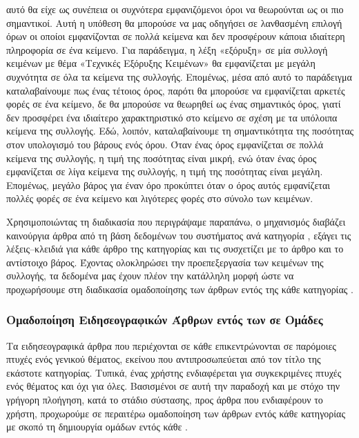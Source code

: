 {{{{{{\begin{itemize}
αυτό θα είχε ως συνέπεια οι συχνότερα εμφανιζόμενοι όροι να θεωρούνται ως οι πιο σημαντικοί. 
Αυτή η υπόθεση θα μπορούσε να μας οδηγήσει σε λανθασμένη επιλογή 
όρων οι οποίοι εμφανίζονται σε πολλά κείμενα και δεν προσφέρουν κάποια ιδιαίτερη πληροφορία σε ένα κείμενο. 
Για παράδειγμα, η λέξη «εξόρυξη» σε μία συλλογή κειμένων με θέμα «Τεχνικές Εξόρυξης Κειμένων» 
θα εμφανίζεται με μεγάλη συχνότητα σε όλα τα κείμενα της συλλογής. 
Επομένως, μέσα από αυτό το παράδειγμα καταλαβαίνουμε πως ένας τέτοιος όρος, παρότι θα μπορούσε 
να εμφανίζεται αρκετές φορές σε ένα κείμενο, δε θα μπορούσε να θεωρηθεί ως ένας σημαντικός όρος,
γιατί δεν προσφέρει ένα ιδιαίτερο χαρακτηριστικό στο  κείμενο σε σχέση με τα υπόλοιπα κείμενα της συλλογής.
Εδώ, λοιπόν, καταλαβαίνουμε τη σημαντικότητα της ποσότητας {} στον υπολογισμό του βάρους ενός όρου. 
Όταν ένας όρος εμφανίζεται σε πολλά κείμενα της συλλογής, η τιμή της ποσότητας {} είναι μικρή, 
ενώ όταν ένας όρος εμφανίζεται σε λίγα κείμενα της συλλογής, η τιμή της ποσότητας {} είναι μεγάλη. \\
Επομένως, μεγάλο βάρος για έναν όρο προκύπτει όταν ο όρος αυτός εμφανίζεται πολλές φορές σε ένα κείμενο 
και λιγότερες φορές στο σύνολο των κειμένων. \\
\end{itemize}

Χρησιμοποιώντας τη διαδικασία που περιγράψαμε παραπάνω, ο μηχανισμός διαβάζει
καινούργια άρθρα από τη βάση δεδομένων του συστήματος ανά κατηγορία {}, 
εξάγει τις λέξεις–κλειδιά για κάθε άρθρο της κατηγορίας και τις συσχετίζει με το άρθρο και το αντίστοιχο βάρος. 
Έχοντας ολοκληρώσει την προεπεξεργασία των κειμένων της συλλογής, 
τα δεδομένα μας έχουν πλέον την κατάλληλη μορφή ώστε να προχωρήσουμε στη διαδικασία ομαδοποίησης 
των άρθρων εντός της κάθε κατηγορίας {}. 

\subsubsection{Ομαδοποίηση Ειδησεογραφικών Άρθρων εντός των {} σε Ομάδες {}}

\par Τα ειδησεογραφικά άρθρα που περιέχονται σε κάθε {} επικεντρώνονται σε παρόμοιες πτυχές ενός γενικού θέματος, 
εκείνου που αντιπροσωπεύεται από τον τίτλο της εκάστοτε κατηγορίας. 
Τυπικά, ένας χρήστης ενδιαφέρεται για συγκεκριμένες πτυχές ενός θέματος και όχι για όλες. 
Βασισμένοι σε αυτή την παραδοχή και με στόχο την γρήγορη πλοήγηση, κατά το στάδιο σύστασης, προς άρθρα που ενδιαφέρουν το χρήστη, 
προχωρούμε σε περαιτέρω ομαδοποίηση των άρθρων εντός κάθε κατηγορίας με σκοπό τη δημιουργία ομάδων {} εντός κάθε {}. \\

}}}}}}
